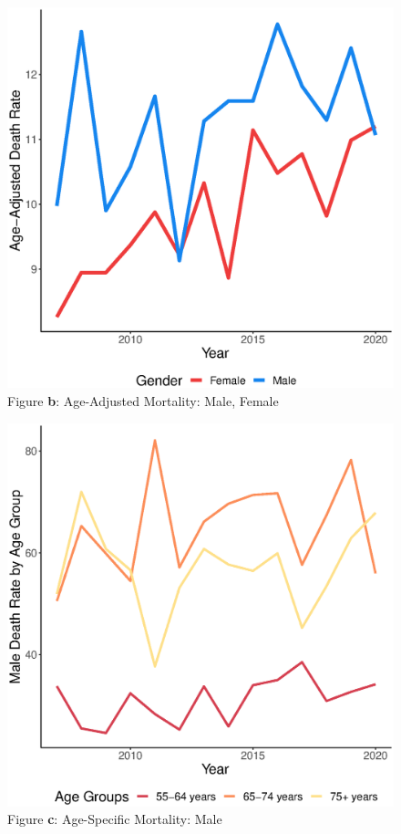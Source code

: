 \documentclass[12pt]{article}
\begin{document}
\begin{figure}
    \centering
    \includegraphics[scale=0.5]{analysis/output/age_adj_deaths_by_gender_plot.eps}
    \caption{Figure \textbf{b}: Age-Adjusted Mortality: Male, Female}
    \label{fig:age_adj_deaths_by_gender}
\end{figure}


\begin{figure}
    \centering
    \includegraphics[scale=0.5]{analysis/output/male_age_specific_deaths_plot.eps}
    \caption{Figure \textbf{c}: Age-Specific Mortality: Male}
    \label{fig:male_age_specific_deaths}
\end{figure}
\end{document}
